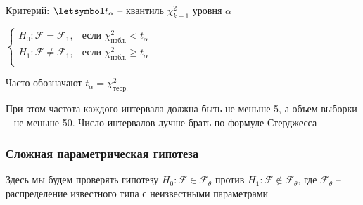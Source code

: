 \begin{enumerate}[label*=\Roman*. ]
    Критерий: $\letsymbol t_\alpha$ -- квантиль $\chi^2_{k - 1}$ уровня $\alpha$

    $\begin{cases}
        H_0 : \mathcal{F} = \mathcal{F}_1, & \text{если } \chi^2_\text{набл.} < t_\alpha \\
        H_1 : \mathcal{F} \neq \mathcal{F}_1, & \text{если } \chi^2_\text{набл.} \geq t_\alpha \\
    \end{cases}$

    \Nota Часто обозначают $t_\alpha = \chi^2_\text{теор.}$

    \Notas При этом частота каждого интервала должна быть не меньше 5, а объем выборки -- не меньше 50. 
    Число интервалов лучше брать по формуле Стерджесса
\end{enumerate}

\subsubsection{Сложная параметрическая гипотеза}

Здесь мы будем проверять гипотезу $H_0 : \mathcal{F} \in \mathcal{F}_\theta$ против $H_1 : \mathcal{F} \not\in \mathcal{F}_\theta$, где $\mathcal{F}_\theta$ -- распределение 
известного типа с неизвестными параметрами

